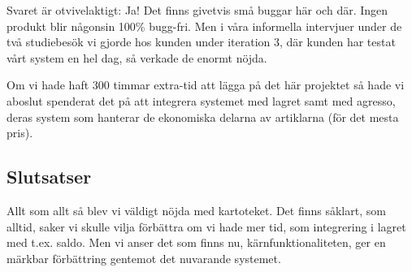 Svaret är otvivelaktigt: Ja! Det finns
givetvis små buggar här och där. Ingen
produkt blir någonsin 100\% bugg-fri.
Men i våra informella intervjuer under de två studiebesök vi gjorde hos kunden
under iteration 3, där kunden har testat
vårt system en hel dag, så verkade de enormt nöjda.

Om vi hade haft 300 timmar extra-tid
att lägga på det här projektet så hade
vi aboslut spenderat det på att integrera
systemet med lagret samt med agresso, deras system
som hanterar de ekonomiska delarna av artiklarna (för det mesta pris).




\subsection{Slutsatser}
Allt som allt så blev vi väldigt nöjda med kartoteket.
Det finns såklart, som alltid, saker vi skulle vilja förbättra om vi
hade mer tid, som integrering i lagret med t.ex. saldo.
Men vi anser det som finns nu, kärnfunktionaliteten,
ger en märkbar förbättring gentemot det nuvarande systemet.




